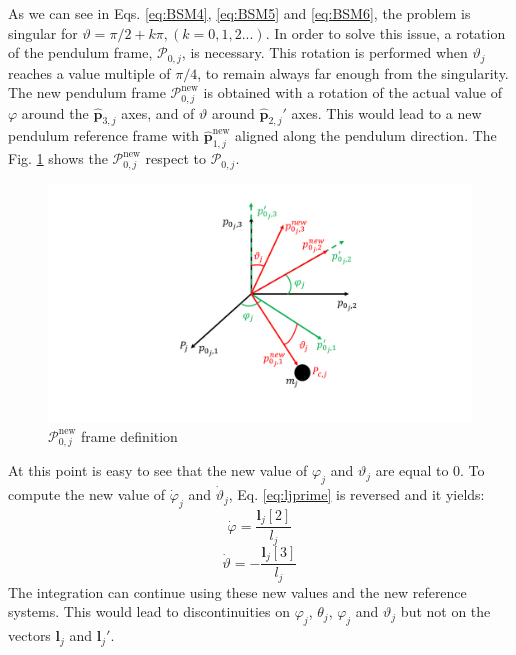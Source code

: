 As we can see in Eqs. \eqref{eq:BSM4}, \eqref{eq:BSM5} and \eqref{eq:BSM6}, the problem is singular for $\vartheta=\pi/2+k\pi, (k=0,1,2...)$. In order to solve this issue, a rotation of the pendulum frame, $\mathcal{P}_{0,j}$, is necessary. This rotation is performed when $\vartheta_j$ reaches a value multiple of $\pi/4$, to remain always far enough from the singularity. The new pendulum frame $\mathcal{P}_{0,j}^{\text{new}}$ is obtained with a rotation of the actual value of $\varphi$ around the $\bm{\hat{p}}_{3,j}$ axes, and of $\vartheta$ around $\bm{\hat{p}}_{2,j}'$ axes. This would lead to a new pendulum reference frame with $\bm{\hat{p}}_{1,j}^{\text{new}}$ aligned along the pendulum direction. The Fig. \ref{fig:newreferencesystem} shows the $\mathcal{P}_{0,j}^{\text{new}}$ respect to $\mathcal{P}_{0,j}$.
\begin{figure}[ht]
	\centering
	\includegraphics[width=13cm]{Figures/referencesystemsP0.pdf}
	\caption{$\mathcal{P}_{0,j}^{\text{new}}$ frame definition}
	\label{fig:newreferencesystem}
\end{figure} 
At this point is easy to see that the new value of $\varphi_j$ and $\vartheta_j$ are equal to 0. To compute the new value of $\dot{\varphi}_j$ and $\dot{\vartheta}_j$, Eq. \eqref{eq:ljprime} is reversed and it yields:
\begin{equation}
	\dot{\varphi}=\frac{\bm{l}_j[2]}{l_j}
	\label{eq:RSC1}
\end{equation}
\begin{equation}
	\dot{\vartheta}=-\frac{\bm{l}_j[3]}{l_j}
	\label{eq:RSC2}
\end{equation}
The integration can continue using these new values and the new reference systems. This would lead to discontinuities on $\varphi_j$, $\theta_j$, $\varphi_j$ and $\vartheta_j$ but not on the vectors $\bm{l}_j$ and $\bm{l}_{j}'$.